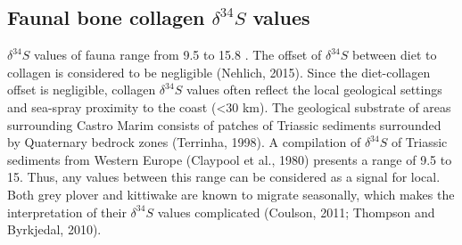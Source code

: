 \documentclass[review]{elsarticle} %
\begin{document}
\hypertarget{sulphur}{%
\subsection{\texorpdfstring{Faunal bone collagen \(\delta ^{34}S\) values}{Faunal bone collagen \textbackslash delta \^{}\{34\}S values}}\label{sulphur}}

\(\delta ^{34}S\) values of fauna range from 9.5 \text{\textperthousand} to 15.8 \text{\textperthousand}. The offset of \(\delta ^{34}S\) between diet to collagen is considered to be negligible (Nehlich, 2015). Since the diet-collagen offset is negligible, collagen \(\delta ^{34}S\) values often reflect the local geological settings and sea-spray proximity to the coast (\textless30 km). The geological substrate of areas surrounding Castro Marim consists of patches of Triassic sediments surrounded by Quaternary bedrock zones (Terrinha, 1998). A compilation of \(\delta ^{34}S\) of Triassic sediments from Western Europe (Claypool et al., 1980) presents a range of 9.5\text{\textperthousand} to 15\text{\textperthousand}. Thus, any values between this range can be considered as a signal for local. Both grey plover and kittiwake are known to migrate seasonally, which makes the interpretation of their \(\delta ^{34}S\) values complicated (Coulson, 2011; Thompson and Byrkjedal, 2010).
\end{document}

